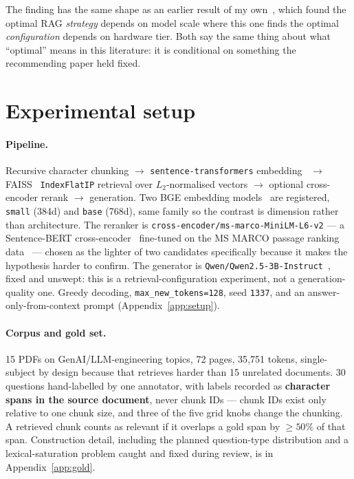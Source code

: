 The finding has the same shape as an earlier result of my
own~\citep{tawil2026david}, which found the optimal RAG \emph{strategy} depends
on model scale where this one finds the optimal \emph{configuration} depends on
hardware tier. Both say the same thing about what ``optimal'' means in this
literature: it is conditional on something the recommending paper held fixed.

\section{Experimental setup}
\label{sec:setup}

\paragraph{Pipeline.} Recursive character chunking $\rightarrow$
\texttt{sentence-transformers} embedding~\citep{reimers2019sbert} $\rightarrow$
FAISS~\citep{douze2024faiss} \texttt{IndexFlatIP} retrieval over
$L_2$-normalised vectors $\rightarrow$ optional cross-encoder rerank
$\rightarrow$ generation. Two BGE embedding models~\citep{xiao2023cpack} are
registered, \texttt{small} (384d) and \texttt{base} (768d), same family so the
contrast is dimension rather than architecture. The reranker is
\texttt{cross-encoder/ms-marco-MiniLM-L6-v2} --- a Sentence-BERT
cross-encoder~\citep{reimers2019sbert} fine-tuned on the MS MARCO passage
ranking data~\citep{bajaj2016msmarco} --- chosen as the lighter of two
candidates specifically because it makes the hypothesis harder to confirm. The
generator is
\texttt{Qwen/Qwen2.5-3B-Instruct}~\citep{qwen2024qwen25}, fixed and unswept:
this is a retrieval-configuration experiment, not a generation-quality one.
Greedy decoding, \texttt{max\_new\_tokens=128}, seed \texttt{1337}, and an
answer-only-from-context prompt (Appendix~\ref{app:setup}).

\paragraph{Corpus and gold set.} 15 PDFs on GenAI/LLM-engineering topics, 72
pages, 35{,}751 tokens, single-subject by design because that retrieves harder
than 15 unrelated documents. 30 questions hand-labelled by one annotator, with
labels recorded as \textbf{character spans in the source document}, never chunk
IDs --- chunk IDs exist only relative to one chunk size, and three of the five
grid knobs change the chunking. A retrieved chunk counts as relevant if it
overlaps a gold span by $\geq 50\%$ of that span. Construction detail, including
the planned question-type distribution and a lexical-saturation problem caught
and fixed during review, is in Appendix~\ref{app:gold}.

